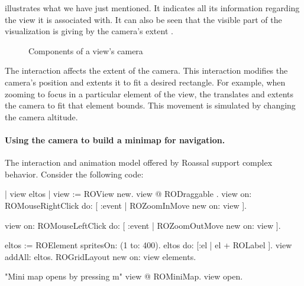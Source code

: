 \documentclass[a4paper,10pt,twoside]{book}
\begin{document}
 illustrates what we have just mentioned. It indicates all its information regarding the view it is associated with. It can also be seen that the visible part of the visualization is giving by the camera's extent .


\begin{figure}[H]
        \centering
		 \hfill
		\hfill
        \caption{Components of a view's camera}\label{fig:cameraDiagram}
\end{figure}

The  interaction affects the extent of the camera. This interaction modifies the camera's position and extents it to fit a desired rectangle. For example, when zooming to focus in a particular element of the view, the   translates and extents the camera to fit that element bounds.
This movement is simulated by changing the camera altitude.

\paragraph{Using the camera to build a minimap for navigation.}
The interaction and animation model offered by Roassal support complex behavior. Consider the following code:

\begin{code}{}
| view eltos |
view := ROView new.
view @ RODraggable .
view on: ROMouseRightClick do: [ :event | 
		ROZoomInMove new on: view ].

view on: ROMouseLeftClick do: [ :event | 
		ROZoomOutMove new on: view ].

eltos := ROElement spritesOn: (1 to: 400).
eltos do:  [:el | el + ROLabel  ].
view addAll: eltos.
ROGridLayout new on: view elements.

"Mini map opens by pressing m"
view @ ROMiniMap.
view open.
\end{code}
\end{document}
